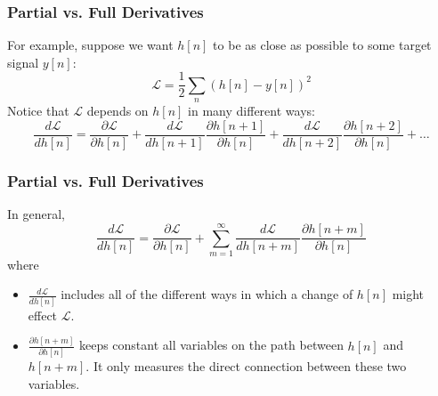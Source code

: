 \documentclass{beamer}
\begin{document}
\begin{frame}
  \frametitle{Partial vs. Full Derivatives}

  For example, suppose we want $h[n]$ to be as close as possible to
  some target signal $y[n]$:
  \[
  {\mathcal L} = \frac{1}{2}\sum_n \left(h[n]-y[n]\right)^2
  \]
  Notice that ${\mathcal L}$ depends on $h[n]$ in many different ways:
  \[
  \frac{d{\mathcal L}}{d h[n]}=\frac{\partial {\mathcal L}}{\partial h[n]}+
  \frac{d{\mathcal L}}{d h[n+1]}\frac{\partial h[n+1]}{\partial h[n]}+
  \frac{d{\mathcal L}}{d h[n+2]}\frac{\partial h[n+2]}{\partial h[n]}+\ldots
  \]
\end{frame}
\begin{frame}
  \frametitle{Partial vs. Full Derivatives}
  In general,
  \[
  \frac{d{\mathcal L}}{d h[n]}=\frac{\partial {\mathcal L}}{\partial h[n]}+
  \sum_{m=1}^\infty\frac{d{\mathcal L}}{d h[n+m]}\frac{\partial h[n+m]}{\partial h[n]}
  \]
  where
  \begin{itemize}
  \item $\frac{d{\mathcal L}}{dh[n]}$ includes all of the different ways in
    which a change of $h[n]$ might effect $\mathcal{L}$.
  \item $\frac{\partial h[n+m]}{\partial h[n]}$ keeps constant all
    variables on the path between $h[n]$ and $h[n+m]$.  It only measures the
    direct connection between these two variables.
  \end{itemize}
\end{frame}
\end{document}
